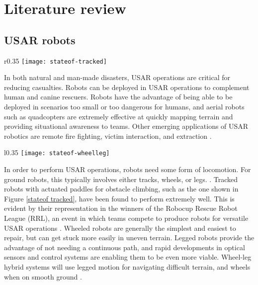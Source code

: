  \chapter{Literature review}

\section{USAR robots}

\begin{wrapfigure}{r}{0.35\textwidth} %
	\centering
	\texttt{[image: stateof-tracked]}
	\caption{A tracked USAR robot, with paddles for obstacle climbing \citep{stateof}.}
	\label{stateof tracked}
\end{wrapfigure}

In both natural and man-made disasters, USAR operations are critical for reducing casualties. Robots can be deployed in USAR operations to complement human and canine rescuers. Robots have the advantage of being able to be deployed in scenarios too small or too dangerous for humans, and aerial robots such as quadcopters are extremely effective at quickly mapping terrain and providing situational awareness to teams. Other emerging applications of USAR robotics are remote fire fighting, victim interaction, and extraction \citep{stateof}.\\
\begin{wrapfigure}{l}{0.35\textwidth} %
	\centering
	\texttt{[image: stateof-wheelleg]}
	\caption{ANYmal, a legged USAR robot \citep{stateof}.}
	\label{stateof wheelleg}
\end{wrapfigure}

In order to perform USAR operations, robots need some form of locomotion. For ground robots, this typically involves either tracks, wheels, or legs. \citep{stateof}. Tracked robots with actuated paddles for obstacle climbing, such as the one shown in Figure \ref{stateof tracked}, have been found to perform extremely well. This is evident by their representation in the winners of the Robocup Rescue Robot League (RRL), an event in which teams compete to produce robots for versatile USAR operations \citep{Sheh-2016}. Wheeled robots are generally the simplest and easiest to repair, but can get stuck more easily in uneven terrain. Legged robots provide the advantage of not needing a continuous path, and rapid developments in optical sensors and control systems are enabling them to be even more viable. Wheel-leg hybrid systems will use legged motion for navigating difficult terrain, and wheels when on smooth ground \citep{stateof}. 
\newpage
